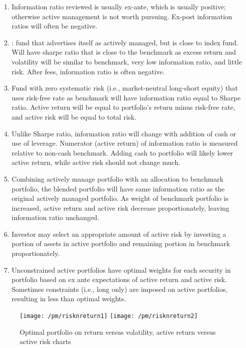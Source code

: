\begin{remark} 
\begin{enumerate}[label=\roman*.]
\setlength{\itemsep}{0pt}
\item Information ratio reviewed is usually ex-ante, which is usually positive; otherwise active management is not worth pursuing. Ex-post information ratios will often be negative.
\item {}: fund that advertises itself as actively managed, but is close to index fund.\\
Will have sharpe ratio that is close to the benchmark as excess return and volatility will be similar to benchmark, very low information ratio, and little risk. After fees, information ratio is often negative.
\item Fund with zero systematic risk (i.e., market-neutral long-short equity) that uses risk-free rate as benchmark will have information ratio equal to Sharpe ratio. Active return will be equal to portfolio's return minus risk-free rate, and active risk will be equal to total risk.
\item Unlike Sharpe ratio, information ratio will change with addition of cash or use of leverage. Numerator (active return) of information ratio is measured relative to non-cash benchmark. Adding cash to portfolio will likely lower active return, while active risk should not change much.
\item Combining actively manage portfolio with an allocation to benchmark portfolio, the blended portfolio will have same information ratio as the original actively managed portfolio. As weight of benchmark portfolio is increased, active return and active risk decrease proportionately, leaving information ratio unchanged.
\item Investor may select an appropriate amount of active risk by investing a portion of assets in active portfolio and remaining portion in benchmark proportionately.
\item Unconstrained active portfolios have optimal weights for each security in portfolio based on ex ante expectations of active return and active risk. Sometimes constraints (i.e., long only) are imposed on active portfolios, resulting in less than optimal weights.
\end{enumerate}
\end{remark}

\begin{figure}[H]
\centering
\texttt{[image: /pm/risknreturn1]}
\texttt{[image: /pm/risknreturn2]}
\caption{Optimal portfolio on return versus volatility, active return versus active risk charts}
\end{figure}

